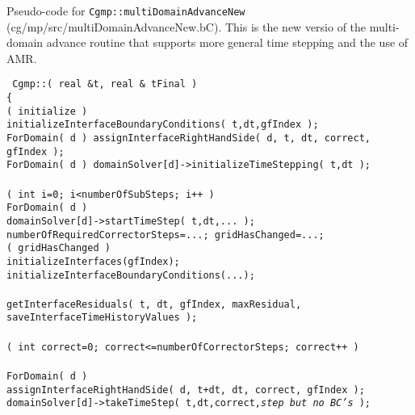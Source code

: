 \documentclass[11pt]{article}
\newcommand{\green}{\color{green}}
\begin{document}
Pseudo-code for {\tt Cgmp::multiDomainAdvanceNew} (cg/mp/src/multiDomainAdvanceNew.bC). This is 
the new versio of the multi-domain advance routine that supports more general time stepping and
the use of AMR.


\begin{flushleft}\tt\small
Cgmp::( real \&t, real \& tFinal ) \\
\{  \\
\ia  \IF( initialize ) \\
\ib    initializeInterfaceBoundaryConditions( t,dt,gfIndex );\\
\ib    ForDomain( d ) assignInterfaceRightHandSide( d, t, dt, correct, gfIndex );\\
\ib    ForDomain( d ) domainSolver[d]->initializeTimeStepping( t,dt );\\
\ia  {}\\
\ia  \FOR( int i=0; i<numberOfSubSteps; i++ )\\
\ib    ForDomain( d )\\
\ic      domainSolver[d]->startTimeStep( t,dt,... );\\
\ic      numberOfRequiredCorrectorSteps=...; gridHasChanged=...; \\ 
\ib    \IF( gridHasChanged ) \\
\ic      initializeInterfaces(gfIndex); initializeInterfaceBoundaryConditions(...); \\
\ib    {} \\
\ib    getInterfaceResiduals( t, dt, gfIndex, maxResidual, saveInterfaceTimeHistoryValues ); \\
\ib \\
\ib    \FOR( int correct=0; correct<=numberOfCorrectorSteps; correct++ ) \\
\ic       {} \\
\ic       ForDomain( d )  \\
\id         assignInterfaceRightHandSide( d, t+dt, dt, correct, gfIndex ); \\
\id         domainSolver[d]->takeTimeStep( t,dt,correct,{\em\green step but no BC's} );  \\
\ic \\
\ic       {} \\

\end{flushleft}
\end{document}
